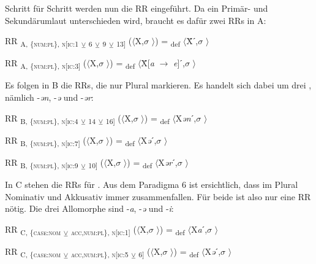 Schritt für Schritt werden nun die RR eingeführt. Da ein Primär- und Sekundärumlaut unterschieden wird, braucht es dafür zwei RRs in  A:

\ea%
\label{ex:key:73}
 RR \textsubscript{A, \{\textsc{num:pl}\}, \textsc{n[}\textsc{ic:}1} \textsubscript{\tiny $\veebar$}\textsubscript{ 6} \textsubscript{\tiny $\veebar$}\textsubscript{ 9} \textsubscript{\tiny $\veebar$}\textsubscript{ 13]} ($\langle$X,$\sigma$ $\rangle$) = \textsubscript{def} $\langle$Ẍˊ,$\sigma$ $\rangle$
\z

\ea%
\label{ex:key:74}
 RR \textsubscript{A, \{\textsc{num:pl}\}, \textsc{n[}\textsc{ic:}3]} ($\langle$X,$\sigma$ $\rangle$) = \textsubscript{def} $\langle$Ẍ[\textit{a} $\rightarrow$ \textit{e}]ˊ,$\sigma$ $\rangle$
\z

Es folgen in  B die RRs, die nur Plural markieren. Es handelt sich dabei um drei , nämlich -\textit{ən}, -\textit{ə} und -\textit{ər}:

\ea%
\label{ex:key:75}
 RR \textsubscript{B, \{\textsc{num:pl}\}, \textsc{n[}\textsc{ic:}4} \textsubscript{\tiny $\veebar$}\textsubscript{ 14} \textsubscript{\tiny $\veebar$}\textsubscript{ 16]} ($\langle$X,$\sigma$ $\rangle$) = \textsubscript{def} $\langle$X\textit{ən}ˊ,$\sigma$ $\rangle$
\z

\ea%
\label{ex:key:76}
 RR \textsubscript{B, \{\textsc{num:pl}\}, \textsc{n[}\textsc{ic:}7]} ($\langle$X,$\sigma$ $\rangle$) = \textsubscript{def} $\langle$X\textit{ə}ˊ,$\sigma$ $\rangle$
\z

\ea%
\label{ex:key:77}
 RR \textsubscript{B, \{\textsc{num:pl}\}, \textsc{n[}\textsc{ic:}9} \textsubscript{\tiny $\veebar$}\textsubscript{ 10]} ($\langle$X,$\sigma$ $\rangle$) = \textsubscript{def} $\langle$X\textit{ər}ˊ,$\sigma$ $\rangle$
\z

In  C stehen die RRs für . Aus dem Paradigma 6 ist ersichtlich, dass im Plural Nominativ und Akkusativ immer zusammenfallen. Für beide  ist also nur eine RR nötig. Die drei Allomorphe sind -\textit{a}, -\textit{ə} und -\textit{i}:

\ea%
\label{ex:key:78}
 RR \textsubscript{C, \{\textsc{case:nom}} \textsubscript{\tiny $\veebar$}\textsubscript{ \textsc{acc},\textsc{num:pl}\}, \textsc{n[}\textsc{ic:}1]} ($\langle$X,$\sigma$ $\rangle$) = \textsubscript{def} $\langle$X\textit{a}ˊ,$\sigma$ $\rangle$
\z

\ea%
\label{ex:key:79}
 RR \textsubscript{C, \{\textsc{case:nom}} \textsubscript{\tiny $\veebar$}\textsubscript{ \textsc{acc},\textsc{num:pl}\}, \textsc{n[}\textsc{ic:}5} \textsubscript{\tiny $\veebar$}\textsubscript{ 6]} ($\langle$X,$\sigma$ $\rangle$) = \textsubscript{def} $\langle$X\textit{ə}ˊ,$\sigma$ $\rangle$
\z

